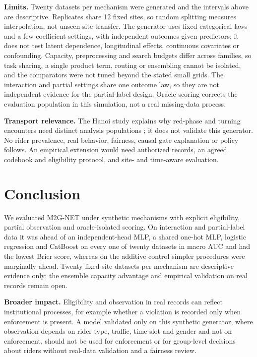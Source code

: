 \documentclass[9pt, conference, a4paper, compsocconf]{IEEEtran}
\begin{document}
\textbf{Limits.} Twenty datasets per mechanism were generated and the intervals above are descriptive. Replicates share 12 fixed sites, so random splitting measures interpolation, not unseen-site transfer. The generator uses fixed categorical laws and a few coefficient settings, with independent outcomes given predictors; it does not test latent dependence, longitudinal effects, continuous covariates or confounding. Capacity, preprocessing and search budgets differ across families, so task sharing, a single product term, routing or ensembling cannot be isolated, and the comparators were not tuned beyond the stated small grids. The interaction and partial settings share one outcome law, so they are not independent evidence for the partial-label design. Oracle scoring corrects the evaluation population in this simulation, not a real missing-data process.

\textbf{Transport relevance.} The Hanoi study explains why red-phase and turning encounters need distinct analysis populations \cite{NguyenPhuoc2024same}; it does not validate this generator. No rider prevalence, real behavior, fairness, causal gate explanation or policy follows. An empirical extension would need authorized records, an agreed codebook and eligibility protocol, and site- and time-aware evaluation.

\section{Conclusion}
We evaluated M2G-NET under synthetic mechanisms with explicit eligibility, partial observation and oracle-isolated scoring. On interaction and partial-label data it was ahead of an independent-head MLP, a shared one-hot MLP, logistic regression and CatBoost on every one of twenty datasets in macro AUC and had the lowest Brier score, whereas on the additive control simpler procedures were marginally ahead. Twenty fixed-site datasets per mechanism are descriptive evidence only; the ensemble capacity advantage and empirical validation on real records remain open.

\textbf{Broader impact.} Eligibility and observation in real records can reflect institutional processes, for example whether a violation is recorded only when enforcement is present. A model validated only on this synthetic generator, where observation depends on rider type, traffic, time slot and gender and not on enforcement, should not be used for enforcement or for group-level decisions about riders without real-data validation and a fairness review.
\end{document}

